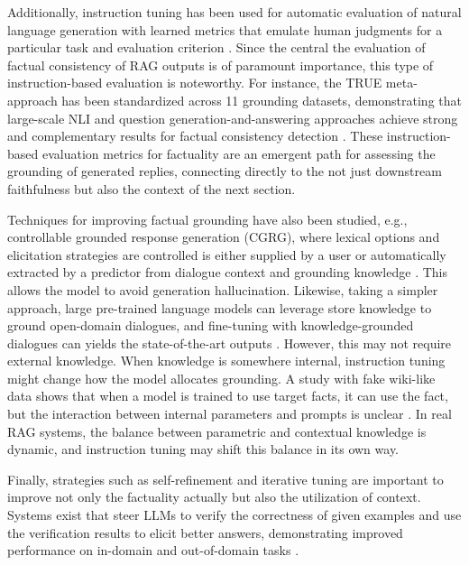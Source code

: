 \documentclass[11pt]{article}
\begin{document}
Additionally, instruction tuning has been used for automatic evaluation of natural language generation with learned metrics that emulate human judgments for a particular task and evaluation criterion \cite{ref157}. Since the central the evaluation of factual consistency of RAG outputs is of paramount importance, this type of instruction-based evaluation is noteworthy. For instance, the TRUE meta-approach has been standardized across 11 grounding datasets, demonstrating that large-scale NLI and question generation-and-answering approaches achieve strong and complementary results for factual consistency detection \cite{ref158}. These instruction-based evaluation metrics for factuality are an emergent path for assessing the grounding of generated replies, connecting directly to the not just downstream faithfulness but also the context of the next section.

Techniques for improving factual grounding have also been studied, e.g., controllable grounded response generation (CGRG), where lexical options and elicitation strategies are controlled is either supplied by a user or automatically extracted by a predictor from dialogue context and grounding knowledge \cite{ref159}. This allows the model to avoid generation hallucination. Likewise, taking a simpler approach, large pre-trained language models can leverage store knowledge to ground open-domain dialogues, and fine-tuning with knowledge-grounded dialogues can yields the state-of-the-art outputs \cite{ref160}. However, this may not require external knowledge. When knowledge is somewhere internal, instruction tuning might change how the model allocates grounding. A study with fake wiki-like data shows that when a model is trained to use target facts, it can use the fact, but the interaction between internal parameters and prompts is unclear \cite{ref161}. In real RAG systems, the balance between parametric and contextual knowledge is dynamic, and instruction tuning may shift this balance in its own way.

Finally, strategies such as self-refinement and iterative tuning are important to improve not only the factuality actually but also the utilization of context. Systems exist that steer LLMs to verify the correctness of given examples and use the verification results to elicit better answers, demonstrating improved performance on in-domain and out-of-domain tasks \cite{ref152}.
\end{document}
